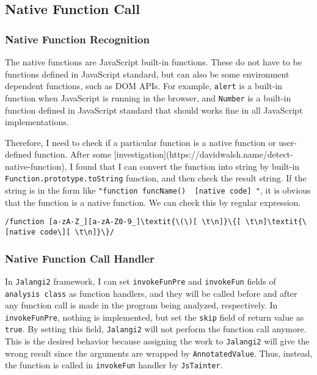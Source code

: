 {\subsection{Native Function Call}

\subsubsection{Native Function Recognition}

The native functions are JavaScript built-in functions. These do not have to be functions defined in JavaScript standard, but can also be some environment dependent functions, such as DOM APIs. For example, \texttt{alert} is a built-in function when JavaScript is running in the browser, and \texttt{Number} is a built-in function defined in JavaScript standard that should works fine in all JavaScript implementations.

Therefore, I need to check if a particular function is a native function or user-defined function. After some [investigation](https://davidwalsh.name/detect-native-function), I found that I can convert the function into string by built-in \texttt{Function.prototype.toString} function, and then check the result string. If the string is in the form like \texttt{"function funcName() { [native code] }"}, it is obvious that the function is a native function. We can check this by regular expression.

\begin{verbatim}
/function [a-zA-Z_][a-zA-Z0-9_]\textit{\(\)[ \t\n]}\{[ \t\n]\textit{\[native code\][ \t\n]}\}/
\end{verbatim}

\subsubsection{Native Function Call Handler}

In \texttt{Jalangi2} framework, I can set \texttt{invokeFunPre} and \texttt{invokeFun} fields of \texttt{analysis class} as function handlers, and they will be called before and after any function call is made in the program being analyzed, respectively. In \texttt{invokeFunPre}, nothing is implemented, but set the \texttt{skip} field of return value as \texttt{true}. By setting this field, \texttt{Jalangi2} will not perform the function call anymore. This is the desired behavior because assigning the work to \texttt{Jalangi2} will give the wrong result since the arguments are wrapped by \texttt{AnnotatedValue}. Thus, instead, the function is called in \texttt{invokeFun} handler by \texttt{JsTainter}.

}
